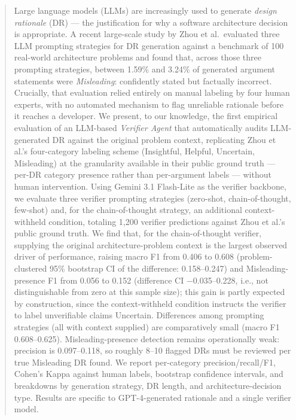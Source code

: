 \documentclass[runningheads]{llncs}
\begin{document}
\begin{abstract}
Large language models (LLMs) are increasingly used to generate \emph{design rationale} (DR) --- the justification for why a software architecture decision is appropriate. A recent large-scale study by Zhou et al.\ evaluated three LLM prompting strategies for DR generation against a benchmark of 100 real-world architecture problems and found that, across those three prompting strategies, between 1.59\% and 3.24\% of generated argument statements were \emph{Misleading}: confidently stated but factually incorrect. Crucially, that evaluation relied entirely on manual labeling by four human experts, with no automated mechanism to flag unreliable rationale before it reaches a developer. We present, to our knowledge, the first empirical evaluation of an LLM-based \emph{Verifier Agent} that automatically audits LLM-generated DR against the original problem context, replicating Zhou et al.'s four-category labeling scheme (Insightful, Helpful, Uncertain, Misleading) at the granularity available in their public ground truth --- per-DR category presence rather than per-argument labels --- without human intervention. Using Gemini 3.1 Flash-Lite as the verifier backbone, we evaluate three verifier prompting strategies (zero-shot, chain-of-thought, few-shot) and, for the chain-of-thought strategy, an additional context-withheld condition, totaling 1{,}200 verifier predictions against Zhou et al.'s public ground truth. We find that, for the chain-of-thought verifier, supplying the original architecture-problem context is the largest observed driver of performance, raising macro F1 from 0.406 to 0.608 (problem-clustered 95\% bootstrap CI of the difference: 0.158--0.247) and Misleading-presence F1 from 0.056 to 0.152 (difference CI $-$0.035--0.228, i.e., not distinguishable from zero at this sample size); this gain is partly expected by construction, since the context-withheld condition instructs the verifier to label unverifiable claims Uncertain. Differences among prompting strategies (all with context supplied) are comparatively small (macro F1 0.608--0.625). Misleading-presence detection remains operationally weak: precision is 0.097--0.118, so roughly 8--10 flagged DRs must be reviewed per true Misleading DR found. We report per-category precision/recall/F1, Cohen's Kappa against human labels, bootstrap confidence intervals, and breakdowns by generation strategy, DR length, and architecture-decision type. Results are specific to GPT-4-generated rationale and a single verifier model.

\end{abstract}
\end{document}
